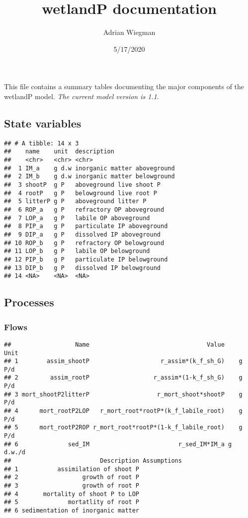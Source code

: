 \documentclass[
]{article}
\title{wetlandP documentation}
\author{Adrian Wiegman}
\date{5/17/2020}
\begin{document}
\maketitle

This file contains a summary tables documenting the major components of
the wetlandP model. \emph{The current model version is 1.1}.

\hypertarget{state-variables}{%
\subsection{State variables}\label{state-variables}}

\begin{verbatim}
## # A tibble: 14 x 3
##    name    unit  description                 
##    <chr>   <chr> <chr>                       
##  1 IM_a    g d.w inorganic matter aboveground
##  2 IM_b    g d.w inorganic matter belowground
##  3 shootP  g P   aboveground live shoot P    
##  4 rootP   g P   belowground live root P     
##  5 litterP g P   aboveground litter P        
##  6 ROP_a   g P   refractory OP aboveground   
##  7 LOP_a   g P   labile OP aboveground       
##  8 PIP_a   g P   particulate IP aboveground  
##  9 DIP_a   g P   dissolved IP aboveground    
## 10 ROP_b   g P   refractory OP belowground   
## 11 LOP_b   g P   labile OP belowground       
## 12 PIP_b   g P   particulate IP belowground  
## 13 DIP_b   g P   dissolved IP belowground    
## 14 <NA>    <NA>  <NA>
\end{verbatim}

\hypertarget{processes}{%
\subsection{Processes}\label{processes}}

\hypertarget{flows}{%
\subsubsection{Flows}\label{flows}}

\begin{verbatim}
##                  Name                                 Value     Unit
## 1        assim_shootP                    r_assim*(k_f_sh_G)    g P/d
## 2         assim_rootP                  r_assim*(1-k_f_sh_G)    g P/d
## 3 mort_shootP2litterP                   r_mort_shoot*shootP    g P/d
## 4      mort_rootP2LOP   r_mort_root*rootP*(k_f_labile_root)    g P/d
## 5      mort_rootP2ROP r_mort_root*rootP*(1-k_f_labile_root)    g P/d
## 6              sed_IM                         r_sed_IM*IM_a g d.w./d
##                         Description Assumptions
## 1           assimilation of shoot P            
## 2                  growth of root P            
## 3                  growth of root P            
## 4       mortality of shoot P to LOP            
## 5              mortatlity of root P            
## 6 sedimentation of inorganic matter
\end{verbatim}
\end{document}
